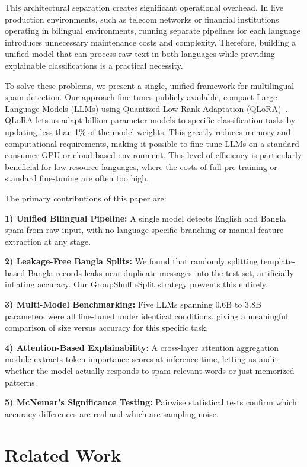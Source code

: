 \documentclass[journal]{IEEEtran}
\begin{document}
This architectural separation creates significant operational overhead. In live production environments, such as telecom networks or financial institutions operating in bilingual environments, running separate pipelines for each language introduces unnecessary maintenance costs and complexity. Therefore, building a unified model that can process raw text in both languages while providing explainable classifications is a practical necessity.

To solve these problems, we present a single, unified framework for multilingual spam detection. Our approach fine-tunes publicly available, compact Large Language Models (LLMs) using Quantized Low-Rank Adaptation (QLoRA)~\cite{ref11}. QLoRA lets us adapt billion-parameter models to specific classification tasks by updating less than 1\% of the model weights. This greatly reduces memory and computational requirements, making it possible to fine-tune LLMs on a standard consumer GPU or cloud-based environment. This level of efficiency is particularly beneficial for low-resource languages, where the costs of full pre-training or standard fine-tuning are often too high.

The primary contributions of this paper are:

\textbf{1) Unified Bilingual Pipeline:} A single model detects English and Bangla spam from raw input, with no language-specific branching or manual feature extraction at any stage.

\textbf{2) Leakage-Free Bangla Splits:} We found that randomly splitting template-based Bangla records leaks near-duplicate messages into the test set, artificially inflating accuracy. Our GroupShuffleSplit strategy prevents this entirely.

\textbf{3) Multi-Model Benchmarking:} Five LLMs spanning 0.6B to 3.8B parameters were all fine-tuned under identical conditions, giving a meaningful comparison of size versus accuracy for this specific task.

\textbf{4) Attention-Based Explainability:} A cross-layer attention aggregation module extracts token importance scores at inference time, letting us audit whether the model actually responds to spam-relevant words or just memorized patterns.

\textbf{5) McNemar's Significance Testing:} Pairwise statistical tests confirm which accuracy differences are real and which are sampling noise.

\section{Related Work}
\end{document}
